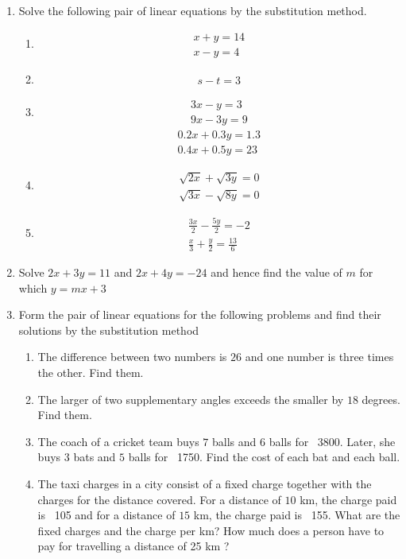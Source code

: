 \begin{enumerate}
\item Solve the following pair of linear equations by the substitution method.
\begin{enumerate}[label=(\roman*)]    
	\item
	\begin{align}
   	 x+y=14 \\x-y=4
	\end{align}
    	\item 
	\begin{align}
	s-t=3
	\end{align}
	\item
	\begin{align}
    	3x-y=3\\ 9x-3y=9
	\end{align}
	\begin{align}   	
 	0.2x+0.3y=1.3\\ 0.4x+0.5y=23
	\end{align}
	\item     
	\begin{align}
	\sqrt{2x}+\sqrt{3y}=0\\ \sqrt{3x}-\sqrt{8y}=0
	\end{align}
	\item
	\begin{align}
    	\frac{3x}{2}-\frac{5y}{2}=-2\\ \frac{x}{3}+\frac{y}{2}=\frac{13}{6}
    	\end{align}
	\end{enumerate}
\item Solve $2x+3y=11$ and $2x+4y=-24$ and hence find the value of $m$ for which $y=mx+3$
\item Form the pair of linear equations for the following problems and find their solutions by the substitution method
    \begin{enumerate}[label=(\Roman*)]
    \item The difference between two numbers is $26$ and one number is three times the other. Find them.
    \item The larger of two supplementary angles exceeds the smaller by $18$ degrees. Find them.
    \item The coach of a cricket team buys $7$ balls and $6$ balls for \rupee~3800. Later, she buys $3$ bats and $5$ balls for \rupee~1750. Find the cost of each bat and each ball.
    \item The taxi charges in a city consist of a fixed charge together with the charges for the distance covered. For a distance of $10$ km, the charge paid is \rupee~105 and for a distance of $15$ km, the charge paid is \rupee~155. What are the fixed charges and the charge per km? How much does a person have to pay for travelling a distance of 25 km ? 

\end{enumerate}
\end{enumerate}
